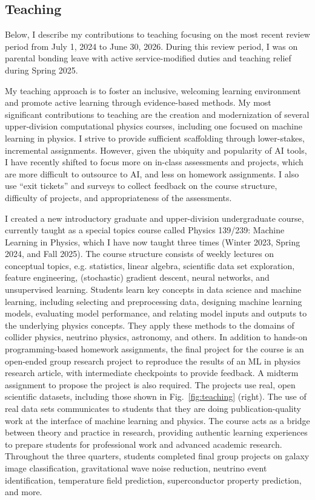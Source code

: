 \documentclass[11pt,letterpaper,notitlepage]{article}
\begin{document}
\pagestyle{fancyplain}

\vspace{-1ex}
\subsection*{Teaching}

Below, I describe my contributions to teaching focusing on the most recent review period from July 1, 2024 to June 30, 2026.
During this review period, I was on parental bonding leave with active service-modified duties and teaching relief during Spring 2025.

My teaching approach is to foster an inclusive, welcoming learning environment and promote active learning through evidence-based methods.
My most significant contributions to teaching are the creation and modernization of several upper-division computational physics courses, including one focused on machine learning in physics.
I strive to provide sufficient scaffolding through lower-stakes, incremental assignments.
However, given the ubiquity and popularity of AI tools, I have recently shifted to focus more on in-class assessments and projects, which are more difficult to outsource to AI, and less on homework assignments.
I also use ``exit tickets'' and surveys to collect feedback on the course structure, difficulty of projects, and appropriateness of the assessments.

I created a new introductory graduate and upper-division undergraduate course, currently taught as a special topics course called Physics 139/239: Machine Learning in Physics, which I have now taught three times (Winter 2023, Spring 2024, and Fall 2025).
The course structure consists of weekly lectures on conceptual topics, e.g. statistics, linear algebra, scientific data set exploration, feature engineering, (stochastic) gradient descent, neural networks, and unsupervised learning.
Students learn key concepts in data science and machine learning, including selecting and preprocessing data, designing machine learning models, evaluating model performance, and relating model inputs and outputs to the underlying physics concepts.
They apply these methods to the domains of collider physics, neutrino physics, astronomy, and others.
In addition to hands-on programming-based homework assignments, the final project for the course is an open-ended group research project to reproduce the results of an ML in physics research article, with intermediate checkpoints to provide feedback.
A midterm assignment to propose the project is also required.
The projects use real, open scientific datasets, including those shown in Fig.~\ref{fig:teaching} (right).
The use of real data sets communicates to students that they are doing publication-quality work at the interface of machine learning and physics.
The course acts as a bridge between theory and practice in research, providing authentic learning experiences to prepare students for professional work and advanced academic research.
Throughout the three quarters, students completed final group projects on galaxy image classification, gravitational wave noise reduction, neutrino event identification, temperature field prediction, superconductor property prediction, and more.
\end{document}
